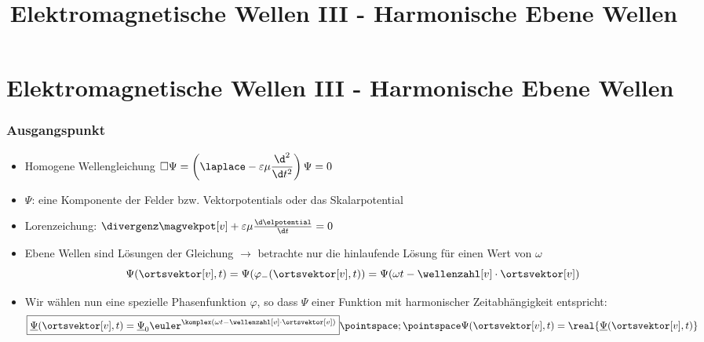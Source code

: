 
  
\title[TET: Elektromagnetische Wellen III - Harmonische Ebene Wellen]{Elektromagnetische Wellen III - Harmonische Ebene Wellen}


% 
% 

\maketitle

% 
% 
\section{Elektromagnetische Wellen III - Harmonische Ebene Wellen}

\begin{frame}
  \frametitle{Ausgangspunkt}
  \begin{itemize}[<+->]
  \item \alert{Homogene} Wellengleichung \(\square\Psi = \left(\laplace - \varepsilon\mu\dfrac{\d^2}{\d t^2} \right)\Psi =0\)
  \item \(\Psi\): eine Komponente der Felder bzw. Vektorpotentials oder das Skalarpotential
  \item \alert{Lorenzeichung}: \(\divergenz\magvekpot[v] +\varepsilon\mu \frac{\d \elpotential}{\d t}=0 \)
  \item \alert{Ebene Wellen} sind Lösungen der Gleichung \(\to\) betrachte nur die \alert{hinlaufende} Lösung für einen Wert von \(\omega\)
    \begin{equation*}
      \Psi(\ortsvektor[v], t) = \Psi(\varphi_-(\ortsvektor[v], t)) = \Psi(\omega t - \wellenzahl[v]\cdot\ortsvektor[v])
    \end{equation*}
  \item Wir wählen nun eine spezielle Phasenfunktion \(\varphi\), so dass \(\Psi\) einer Funktion mit \alert{harmonischer Zeitabhängigkeit} entspricht:
    \begin{equation*}
      \boxed{\underline{\Psi}(\ortsvektor[v], t) = \underline{\Psi}_0 \euler^{\komplex(\omega t -\wellenzahl[v] \cdot \ortsvektor[v])} }\pointspace ; \pointspace \Psi(\ortsvektor[v], t) = \real{\underline{\Psi}(\ortsvektor[v], t)}
      \end{equation*}
  \end{itemize}
\end{frame}


